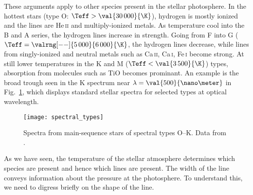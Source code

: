 These arguments apply to other species present in the stellar photosphere.  In the hottest stars (type O: $\Teff > \val{30\,000}{\K}$), hydrogen is mostly ionized and the lines are He\,\textsc{ii} and multiply-ionized metals. As temperature cool into the B and A series, the hydrogen lines increase in strength. Going from F into G ($\Teff = \valrng[--]{5\,000}{6\,000}{\K}$, the hydrogen lines decrease, while lines from singly-ionized and neutral metals such as Ca\,\textsc{ii}, Ca\,\textsc{i}, Fe\,\textsc{i} become strong.  At still lower temperatures in the K and M ($\Teff < \val{3\,500}{\K}$) types, absorption from molecules such as TiO becomes prominant.  An example is the broad trough seen in the K spectrum near $\lambda = \val{500}{\nano\meter}$ in Fig.~\ref{f.spectral-types}, which displays standard stellar spectra for selected types at optical wavelength.

\begin{figure}[hbp]
\texttt{[image: spectral\_types]}
\caption[Standard stellar types]{\label{f.spectral-types} Spectra from main-sequence stars of spectral types O--K. Data from \protect\citet{Jacoby1984A-library-of-st}.}
\end{figure}

As we have seen, the temperature of the stellar atmosphere determines which species are present and hence which lines are present. The width of the line conveys information about the pressure at the photosphere. To understand this, we need to digress briefly on the shape of the line.


